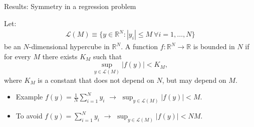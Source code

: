 \documentclass[aspectratio=169,10pt]{beamer}
\begin{document}
\begin{frame}{Results: Symmetry in a regression problem}
		\renewcommand{\arraystretch}{0.5}
	\begin{table}[h!]
		\caption{Results for the regression problem}\vspace{-0.1in}
		\begin{center}
		\end{center}
	\end{table}
	\renewcommand{\arraystretch}{1.0}
	\hyperlink{symmetry}{}
\end{frame}

\begin{frame}
	\begin{definition}
		Let:
		\begin{align*}
			\mathcal{L}(M) \equiv \{y \in \mathbb{R}^N: |y_i|\leq M ~\forall i = 1,\dots,N\}
		\end{align*}
	be an $N$-dimensional hypercube in $\mathbb{R}^N$. A function $f: \mathbb{R}^N\rightarrow \mathbb{R}$ is bounded in $N$ if for every $M$ there exists $K_M$ such that 
	\begin{equation*}
		\sup_{y\in \mathcal{L}(M)} |f(y)| < K_M,
	\end{equation*}
	where $K_M$ is a constant that does not depend on $N$, but may depend on $M$.
	\end{definition}
\begin{itemize}
	\item Example $f(y) = \frac{1}{N}\sum_{i=1}^N y_i$ $\rightarrow$ $\sup_{y\in \mathcal{L}(M)} |f(y)| < M$.\vspace{0.1in}
	\item To avoid $f(y) = \sum_{i=1}^N y_i$ $\rightarrow$ $\sup_{y\in \mathcal{L}(M)} |f(y)| < NM$.
\end{itemize}
\hyperlink{concentration}{}
\end{frame}
\end{document}
